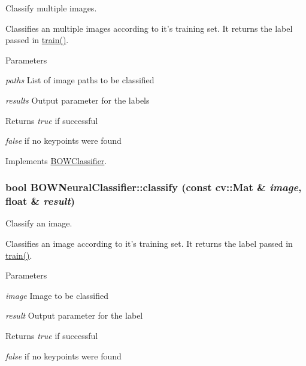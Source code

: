 Classify multiple images. 

Classifies an multiple images according to it's training set. It returns the label passed in \hyperlink{classBOWNeuralClassifier_af5bde18bb49d45421ea1332dee9ff9fa}{train()}.


\begin{DoxyParams}{Parameters}
\item[{\em paths}]List of image paths to be classified \item[{\em results}]Output parameter for the labels \end{DoxyParams}
\begin{DoxyReturn}{Returns}
{\itshape true\/} if successful\par
 {\itshape false\/} if no keypoints were found 
\end{DoxyReturn}


Implements \hyperlink{classBOWClassifier_a0785d39115372051816210d8d2c0335e}{BOWClassifier}.

\hypertarget{classBOWNeuralClassifier_accce7f4efd81373d87b9a6cef7802e1b}{
\subsubsection[{classify}]{\setlength{\rightskip}{0pt plus 5cm}bool BOWNeuralClassifier::classify (const cv::Mat \& {\em image}, \/  float \& {\em result})}}
\label{classBOWNeuralClassifier_accce7f4efd81373d87b9a6cef7802e1b}


Classify an image. 

Classifies an image according to it's training set. It returns the label passed in \hyperlink{classBOWNeuralClassifier_af5bde18bb49d45421ea1332dee9ff9fa}{train()}.


\begin{DoxyParams}{Parameters}
\item[{\em image}]Image to be classified \item[{\em result}]Output parameter for the label \end{DoxyParams}
\begin{DoxyReturn}{Returns}
{\itshape true\/} if successful\par
 {\itshape false\/} if no keypoints were found 
\end{DoxyReturn}


